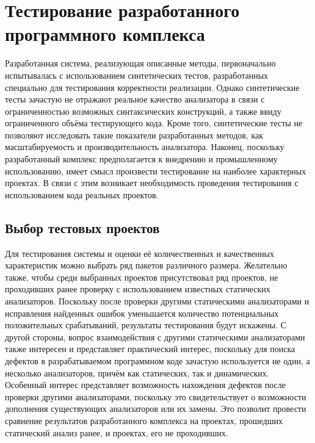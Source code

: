 \chapter{Тестирование разработанного программного комплекса}

Разработанная система, реализующая описанные методы, первоначально испытывалась с использованием синтетических тестов, разработанных специально для тестирования корректности реализации. Однако синтетические тесты зачастую не отражают реальное качество анализатора в связи с ограниченностью возможных синтаксических конструкций, а также ввиду ограниченного объёма тестирующего кода. Кроме того, синтетические тесты не позволяют исследовать такие показатели разработанных методов, как масштабируемость и производительность анализатора. Наконец, поскольку разработанный комплекс предполагается к внедрению и промышленному использованию, имеет смысл произвести тестирование на наиболее характерных проектах. В связи с этим возникает необходимость проведения тестирования с использованием кода реальных проектов.

\section{Выбор тестовых проектов}

Для тестирования системы и оценки её количественных и качественных характеристик можно выбрать ряд пакетов различного размера. Желательно также, чтобы среди выбранных проектов присутствовал ряд проектов, не проходивших ранее проверку с использованием известных статических анализаторов. Поскольку после проверки другими статическими анализаторами и исправления найденных ошибок уменьшается количество потенциальных положительных срабатываний, результаты тестирования будут искажены. С другой стороны, вопрос взаимодействия с другими статическими анализаторами также интересен и представляет практический интерес, поскольку для поиска дефектов в разрабатываемом программном коде зачастую используется не один, а несколько анализаторов, причём как статических, так и динамических. Особенный интерес представляет возможность нахождения дефектов после проверки другими анализаторами, поскольку это свидетельствует о возможности дополнения существующих анализаторов или их замены. Это позволит провести сравнение результатов разработанного комплекса на проектах, прошедших статический анализ ранее, и проектах, его не проходивших.


